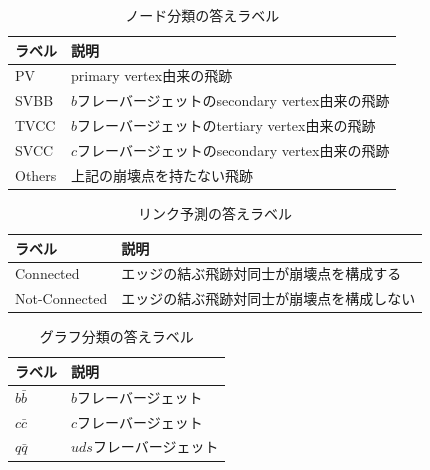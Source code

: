 \begin{table}[H]
    \begin{center}
      \begin{tabular}{l l}
         \hline
	ラベル & 説明\\	
	\hline
	\hline
	PV & primary vertex由来の飛跡\\
	SVBB & $b$フレーバージェットのsecondary vertex由来の飛跡\\
	TVCC & $b$フレーバージェットのtertiary vertex由来の飛跡\\
	SVCC & $c$フレーバージェットのsecondary vertex由来の飛跡\\
	Others & 上記の崩壊点を持たない飛跡\\
	\hline
      \end{tabular}
    \end{center}
    \caption{ノード分類の答えラベル}
    \label{gnnoutput_n}
\end{table}
\begin{table}[H]
    \begin{center}
      \begin{tabular}{l l}
         \hline
	ラベル & 説明\\	
	\hline
	\hline
	Connected & エッジの結ぶ飛跡対同士が崩壊点を構成する\\
	Not-Connected & エッジの結ぶ飛跡対同士が崩壊点を構成しない\\
	\hline
      \end{tabular}
    \end{center}
    \caption{リンク予測の答えラベル}
    \label{gnnoutput_e}
\end{table}
\begin{table}[H]
    \begin{center}
      \begin{tabular}{l l}
         \hline
	ラベル & 説明\\	
	\hline
	\hline
	$b\bar{b}$ & $b$フレーバージェット\\
	$c\bar{c}$ & $c$フレーバージェット\\
	$q\bar{q}$ & $uds$フレーバージェット\\
	\hline
      \end{tabular}
    \end{center}
    \caption{グラフ分類の答えラベル}
  \label{gnnoutput_g}
\end{table}
